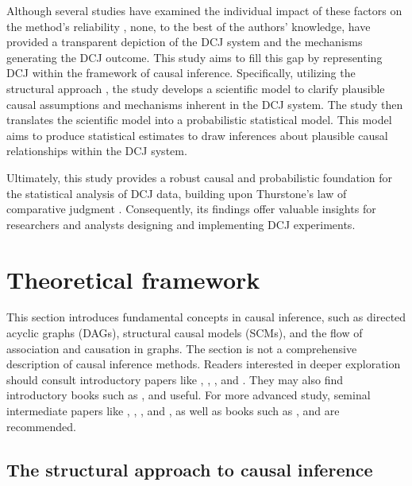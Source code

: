 \documentclass[
  authoryear,
  preprint,
  1p]{elsarticle}
\begin{document}
Although several studies have examined the individual impact of these
factors on the method's reliability
\citep{Bramley_2015, Pollitt_2012b, Bramley_et_al_2019, Verhavert_et_al_2019, Crompvoets_et_al_2022, vanDaal_et_al_2017, Gijsen_et_al_2021, Bouwer_et_al_2023},
none, to the best of the authors' knowledge, have provided a transparent
depiction of the DCJ system and the mechanisms generating the DCJ
outcome. This study aims to fill this gap by representing DCJ within the
framework of causal inference. Specifically, utilizing the structural
approach \citep{Wright_1921, Pearl_2009, Pearl_et_al_2016}, the study
develops a scientific model to clarify plausible causal assumptions and
mechanisms inherent in the DCJ system. The study then translates the
scientific model into a probabilistic statistical model. This model aims
to produce statistical estimates to draw inferences about plausible
causal relationships within the DCJ system.

Ultimately, this study provides a robust causal and probabilistic
foundation for the statistical analysis of DCJ data, building upon
Thurstone's law of comparative judgment \citeyearpar{Thurstone_1927}.
Consequently, its findings offer valuable insights for researchers and
analysts designing and implementing DCJ experiments.

\section{Theoretical framework}\label{sec-framework}

This section introduces fundamental concepts in causal inference, such
as directed acyclic graphs (DAGs), structural causal models (SCMs), and
the flow of association and causation in graphs. The section is not a
comprehensive description of causal inference methods. Readers
interested in deeper exploration should consult introductory papers like
\citet{Pearl_2010}, \citet{Rohrer_2018}, \citet{Pearl_2019}, and
\citet{Cinelli_et_al_2020}. They may also find introductory books such
as \citet{Pearl_et_al_2018}, \citet{Neal_2020} and
\citet{McElreath_2020} useful. For more advanced study, seminal
intermediate papers like \citet{Neyman_et_al_1923}, \citet{Rubin_1974},
\citet{Spirtes_et_al_1991}, and \citet{Sekhon_2009}, as well as books
such as \citet{Pearl_2009}, \citet{Morgan_et_al_2014} and
\citet{Hernan_et_al_2020} are recommended.

\subsection{The structural approach to causal
inference}\label{sec-framework-structural}
\end{document}
